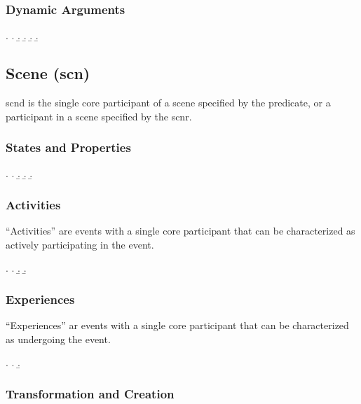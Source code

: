 \documentclass[a4paper]{article}
\begin{document}
\subsubsection{Dynamic Arguments}
\ex. \a. 
     \b. 
     \b. 
     \b. 
     \b. 

\clearpage
\subsection{Scene (\textsf{scn})}
\label{sec:scn}

\textsf{scnd} is the single core participant of a scene specified by the
predicate, or a participant in a scene specified by the \textsf{scnr}.

\subsubsection{States and Properties}

\ex. \a. 
     \b. 
     \b. 
     \b. 

\subsubsection{Activities}

``Activities'' are events with a single core participant that can be
characterized as actively participating in the event.

\ex. \a. 
     \b. 
     \b. 

\subsubsection{Experiences}

``Experiences'' ar events with a single core participant that can be
characterized as undergoing the event.

\ex. \a. 
     \b. 

\subsubsection{Transformation and Creation}
\end{document}
